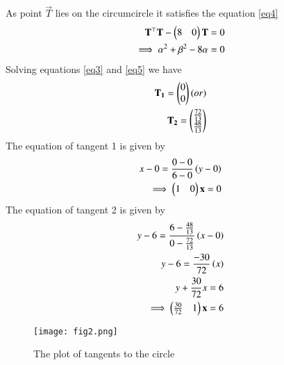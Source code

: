 \documentclass[journal,12pt,twocolumn]{IEEEtran}
\begin{document}
As point $\vec{T}$ lies on the circumcircle it satisfies the equation \ref{eq4}
\begin{align}
    \mathbf{T}^\top\mathbf{T}-\begin{pmatrix}8&0\end{pmatrix}\mathbf{T}&=0\\
    \implies \alpha^{2}+\beta^{2}-8\alpha &=0
    \label{eq5}
\end{align}
Solving equations \ref{eq3} and \ref{eq5} we have
\begin{align}
    \mathbf{T_1} = \begin{pmatrix}0\\0\end{pmatrix} (or)\\
    \mathbf{T_2} = \begin{pmatrix}\frac{72}{13}\\ \frac{48}{13}\end{pmatrix}
\end{align}
The equation of tangent 1 is given by
\begin{align}
    x-0=\frac{0-0}{6-0}\left(y-0\right)\\
    \implies \begin{pmatrix}1&0\end{pmatrix}\mathbf{x}=0
\end{align}
The equation of tangent 2 is given by
\begin{align}
    y-6=\frac{6-\frac{48}{13}}{0-\frac{72}{13}}\left(x-0\right)\\
    y-6=\frac{-30}{72}\left(x\right)\\
    y+\frac{30}{72}x=6\\
    \implies \begin{pmatrix}\frac{30}{72}&1\end{pmatrix}\mathbf{x}=6
\end{align}
\begin{figure}[!ht]
   \centering
   \texttt{[image: fig2.png]}
   \caption{The plot of tangents to the circle }
\end{figure}
\end{document}
